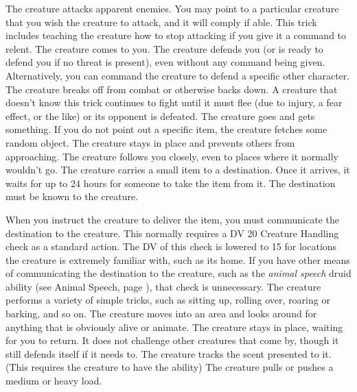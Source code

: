      The creature attacks apparent enemies. You may point to a particular creature that you wish the creature to attack, and it will comply if able. This trick includes teaching the creature how to stop attacking if you give it a command to relent.
     The creature comes to you.
     The creature defends you (or is ready to defend you if no threat is present), even without any command being given. Alternatively, you can command the creature to defend a specific other character.
     The creature breaks off from combat or otherwise backs down. A creature that doesn't know this trick continues to fight until it must flee (due to injury, a fear effect, or the like) or its opponent is defeated.
     The creature goes and gets something. If you do not point out a specific item, the creature fetches some random object.
     The creature stays in place and prevents others from approaching.
     The creature follows you closely, even to places where it normally wouldn't go.
     The creature carries a small item to a destination.
    Once it arrives, it waits for up to 24 hours for someone to take the item from it.
    The destination must be known to the creature.
    \par When you instruct the creature to deliver the item, you must communicate the destination to the creature.
    This normally requires a DV 20 Creature Handling check as a standard action.
    The DV of this check is lowered to 15 for locations the creature is extremely familiar with, such as its home.
    If you have other means of communicating the destination to the creature, such as the \textit{animal speech} druid ability (see Animal Speech, page ), that check is unnecessary.
     The creature performs a variety of simple tricks, such as sitting up, rolling over, roaring or barking, and so on.
     The creature moves into an area and looks around for anything that is obviously alive or animate.
     The creature stays in place, waiting for you to return. It does not challenge other creatures that come by, though it still defends itself if it needs to.
     The creature tracks the scent presented to it. (This requires the creature to have the  ability)
     The creature pulls or pushes a medium or heavy load.

